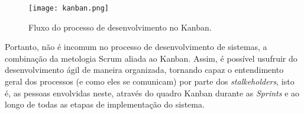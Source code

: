 \begin{figure}[ht]
    \caption{Fluxo do processo de desenvolvimento no Kanban.}
       	\begin{center}
            \texttt{[image: kanban.png]}
        \end{center}
    \label{kanbanFlow}
\end{figure}

Portanto, não é incomum no processo de desenvolvimento de sistemas, a combinação da metologia Scrum aliada ao Kanban. Assim, é possível usufruir do desenvolvimento ágil de maneira organizada, tornando capaz o entendimento geral dos processos (e como eles se comunicam) por parte dos \textit{stalkeholders}, isto é, as pessoas envolvidas neste, através do quadro Kanban durante as \textit{Sprints} e ao longo de todas as etapas de implementação do sistema.